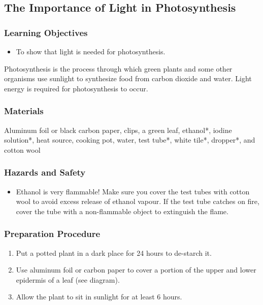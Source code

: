 \subsection{The Importance of Light in Photosynthesis}

\subsubsection*{Learning Objectives}
\begin{itemize}
\item{To show that light is needed for photosynthesis.}
\end{itemize}


Photosynthesis is the process through which green plants and some other organisms use sunlight to synthesize food from carbon dioxide and water. Light energy is required for photosynthesis to occur.

\subsubsection*{Materials}
Aluminum foil or black carbon paper, clips, a green leaf, ethanol*, iodine solution*, heat source, cooking pot, water, test tube*, white tile*, dropper*, and cotton wool

\subsubsection*{Hazards and Safety}
\begin{itemize}
\item{Ethanol is very flammable! Make sure you cover the test tubes with cotton wool to avoid excess release of ethanol vapour. If the test tube catches on fire, cover the tube with a non-flammable object to extinguish the flame.}
\end{itemize}

\subsubsection*{Preparation Procedure}
\begin{enumerate}
\item{Put a potted plant in a dark place for 24 hours to de-starch it.}
\item{Use aluminum foil or carbon paper to cover a portion of the upper and lower epidermis of a leaf (see diagram).}
\item{Allow the plant to sit in sunlight for at least 6 hours.}
\end{enumerate}

